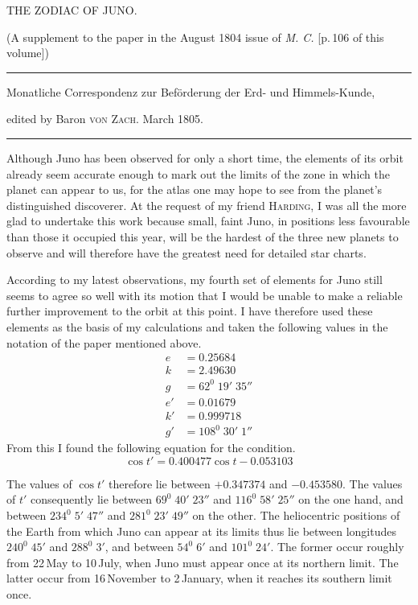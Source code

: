 \clearpage{}%
\begin{center}
{\small THE ZODIAC OF JUNO.\par}
\medskip
{\small (A supplement to the paper in the August 1804 issue of \textit{M. C.} [p.\,106 of this volume])\par}
\medskip\hrule\medskip
{\small Monatliche Correspondenz zur Beförderung der Erd- und Himmels-Kunde,\par
edited by Baron \textsc{von Zach}. March 1805.\par}
\medskip\hrule
\end{center}\medskip
Although Juno has been observed for only a short time, the elements of
its orbit already seem accurate enough to mark out the limits of the
zone in which the planet can appear to us, for the atlas one may hope
to see from the planet’s distinguished discoverer. At the request of my friend
\textsc{Harding}, I was all the more glad to undertake this work
because small, faint Juno, in positions less favourable than those
it occupied this year, will be the hardest of the three new planets
to observe and will therefore have the greatest need for detailed
star charts.

According to my latest observations, my fourth set of elements for
Juno still seems to agree so well with its motion that I would be
unable to make a reliable further improvement to the orbit at this
point. I have therefore used these elements as the basis of my
calculations and taken the following values in the notation of the
paper mentioned above.
\[
\begin{aligned}
e&=0.25684\\
k&=2.49630\\
g&=62^0\;19'\;35''\\
e'&=0.01679\\
k'&=0.999718\\
g'&=108^0\;30'\;1''
\end{aligned}
\]
%
From this I found the following equation for the condition.
\[
\cos t'=0.400477\cos t-0.053103
\]

The values of $\cos t'$ therefore lie between $+0.347374$ and
$-0.453580$. The values of $t'$ consequently lie between
$69^0\;40'\;23''$ and $116^0\;58'\;25''$ on the one hand, and between
$234^0\;5'\;47''$ and $281^0\;23'\;49''$ on the other. The heliocentric
positions of the Earth from which Juno can appear at its limits thus
lie between longitudes $240^0\;45'$ and $288^0\;3'$, and between
$54^0\;6'$ and $101^0\;24'$. The former occur roughly from 22\,May to
10\,July, when Juno must appear once at its northern limit. The
latter occur from 16\,November to 2\,January, when it reaches its
southern limit once.

